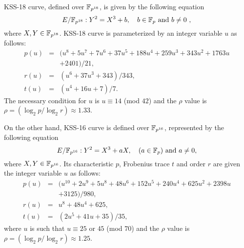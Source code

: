 KSS-18 curve, defined over $\mathbb{F}_{p^{18}}$, is given by the following equation
\begin{equation}\label{eq:KSS_curve_18_chap_ijnc2017_chap_ijnc2017}
E/\mathbb{F}_{p^{18}}:Y^2=X^3+b, \quad \mbox{$b \in {\mathbb{F}}_{p}$ and $b \neq 0$ },
\end{equation}
where  $X,Y \in \mathbb{F}_{p^{18}}$. KSS-18 curve is parameterized by an integer variable $u$ as follows:
\begin{subequations}
\begin{eqnarray}
p(u)  &= &(u^8 +5u^7 +7u^6 +37u^5 +188u^4 +259u^3 + 343u^2 +1763u \nonumber \\
& &   +2401)/21,              \label{eq:kss_char_chap_ijnc2017} \\
r(u) & =&  (u^6 + 37u^3 + 343)/343, \label{eq:kss_degree_chap_ijnc2017}  \\
t(u) &=&  (u^4 + 16u + 7)/7. \label{eq:kss18_trace_chap_ijnc2017} 
\end{eqnarray}
\end{subequations} 
The necessary condition for $u$ is $u \equiv 14$ (mod $42$) and the $\rho$ value is $\rho = (\log_2 p/\log_2 r) \approx 1.33$.

On the other hand, KSS-16 curve is defined over $\mathbb{F}_{p^{16}}$, represented by the following equation
\begin{equation}\label{eq:KSS_16_trace_chap_ijnc2017}
E/\mathbb{F}_{p^{16}}:Y^2=X^3+aX, \quad \mbox{($a \in {\mathbb{F}}_{p}$) and  $a \neq 0$},
\end{equation}
 where $X,Y \in \mathbb{F}_{p^{16}}$. Its characteristic $p$, Frobenius trace $t$ and order $r$ are given the integer variable $u$ as follows:
\begin{subequations}
\begin{eqnarray}
p(u) &= & (u^{10} +2u^9 +5u^8 +48u^6 +152u^5 +240u^4 +625u^2 +2398u \nonumber \\
&& +3125)/980,  \\\label{eq:kss_16_char_trace_chap_ijnc2017}
r(u) &= & u^8 +48u^4 +625,\label{eq:kss_16_degree_chap_ijnc2017}  \\
t(u) &=& (2u^5 +41u+35)/35, \label{eq:kss_16_trace_chap_ijnc2017} 
\end{eqnarray}
\end{subequations} 
where $u$ is such that $u \equiv 25$ or $45$ (mod $70$) and the $\rho$ value is $\rho = (\log_2 p/\log_2 r) \approx 1.25$.

